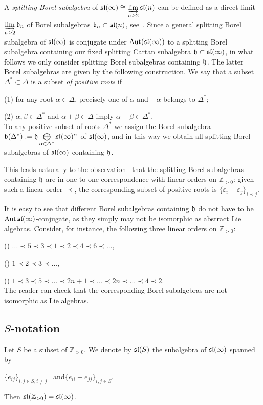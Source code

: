\documentclass[10pt]{amsart}\oddsidemargin -1mm \evensidemargin -1mm \topmargin -15mm\headheight5mm \headsep 3.5mm \textheight 245mm\textwidth 170mm %
\theoremstyle{definition}\newtheorem{theorem}{Theorem}[section]\newtheorem{lemma}[theorem]{Lemma}\newtheorem{remark}[theorem]{Remark}\newtheorem{proposition}[theorem]{Proposition}\newtheorem{corollary}[theorem]{Corollary}\newtheorem{definition}[theorem]{Definition}\newtheorem{Ex}[theorem]{Example}
\newcounter{AP}
\begin{document}
 A {\it splitting Borel subalgebra} of $\frak{sl}(\infty)\cong \varinjlim\limits_{n\ge2}\frak{sl}(n)$ can be defined as a direct limit $\varinjlim\limits_{n\ge2}\frak b_n$ of Borel subalgebras $\frak b_n\subset\frak{sl}(n)$, see~\cite{DP}. Since a general splitting Borel subalgebra of $\frak{sl}(\infty)$ is conjugate under $\operatorname{\mathrm{Aut}}(\frak{sl}(\infty))$ to a splitting Borel subalgebra containing our fixed splitting Cartan subalgebra $\frak h\subset\frak{sl}(\infty)$, in what follows we only consider splitting Borel subalgebras containing $\frak h$.
 The latter Borel subalgebras are given by the following construction. We say that a subset $\Delta^*\subset\Delta$ is a subset {\it of positive roots} if

(1) for any root $\alpha\in\Delta$, precisely one of $\alpha$ and $-\alpha$ belongs to $\Delta^*$;

(2) $\alpha, \beta\in\Delta^*$ and $\alpha+\beta\in\Delta$ imply $\alpha+\beta\in\Delta^*$.\\
To any positive subset of roots $\Delta^*$ we assign the Borel subalgebra $\frak b(\Delta^*):=\frak h\bigoplus\limits_{\alpha\in\Delta^*}\frak{sl}(\infty)^{\alpha}$ of $\frak{sl}(\infty)$, and in this way we obtain all splitting Borel subalgebras of $\frak{sl}(\infty)$ containing $\frak h$.


This leads naturally to the observation~\cite{DP} that the splitting Borel subalgebras containing $\frak h$ are in one-to-one correspondence with linear orders on $\mathbb Z_{>0}$: given such a linear order $\prec$, the corresponding subset of positive roots is $\{\varepsilon_i-\varepsilon_j\}_{i\prec j}$.

It is easy to see that different Borel subalgebras containing $\frak h$ do not have to be $\operatorname{\mathrm{Aut}}\frak{sl}(\infty)$-conjugate, as they simply may not be isomorphic as abstract Lie algebras. Consider, for instance, the following three linear orders on $\mathbb Z_{>0}$:

() $...\prec 5\prec 3\prec 1\prec 2\prec 4\prec 6\prec...$,

() $1\prec 2\prec 3\prec...$,

() $1\prec3\prec5\prec...\prec2n+1\prec...\prec2n\prec...\prec4\prec2$.\\
The reader can check that the corresponding Borel subalgebras are not isomorphic as Lie algebras.

\subsection{$S$-notation}\label{SSsnot}
Let $S$ be a subset of $\mathbb Z_{>0}$. We denote by $\frak{sl}(S)$ the subalgebra of $\frak{sl}(\infty)$ spanned by \begin{center}$\{e_{ij}\}_{i, j\in S, i\ne j}\hspace{10pt}$and\hspace{10pt}$\{e_{ii}-e_{jj}\}_{i, j\in S}.$\end{center}
Then $\frak{sl}(\mathbb Z_{>0})=\frak{sl}(\infty)$.
\end{document}

